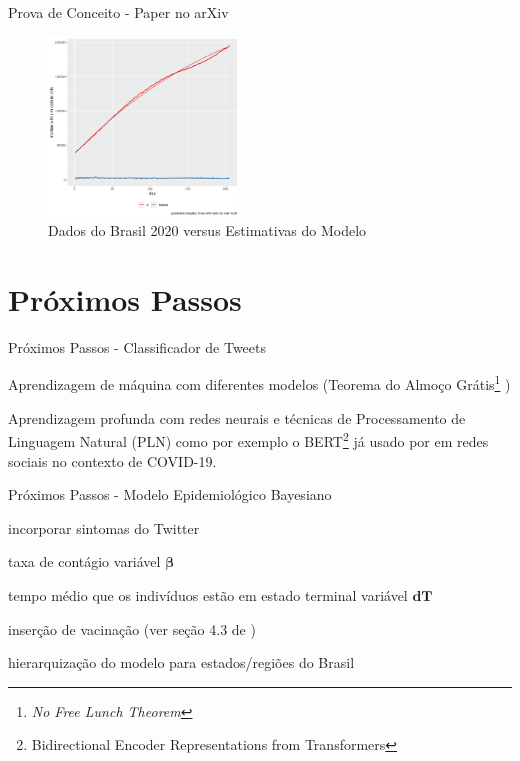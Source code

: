 \documentclass[aspectratio=169]{beamer}                    %
\begin{document}
\begin{frame}{Prova de Conceito - Paper no arXiv \parencite{storopoliSimulationDrivenCOVID19Epidemiological2021a}}
    \begin{figure}
        \centering
        \includegraphics[width=0.45\textwidth]{fit_brazil.png}
        \caption{Dados do Brasil 2020 versus Estimativas do Modelo}
        \label{fig:fit_brazil}
    \end{figure}
\end{frame}

\section{Próximos Passos}
\begin{frame}{Próximos Passos - Classificador de Tweets}
    \begin{vfilleditems}
        \item Aprendizagem de máquina com diferentes modelos (Teorema do Almoço Grátis\footnote{\textit{No Free Lunch Theorem}} \parencite{wolpertLackPrioriDistinctions1996})
        \item Aprendizagem profunda com redes neurais e técnicas de Processamento de Linguagem Natural (PLN)
        como por exemplo o BERT\footnote{Bidirectional Encoder Representations from Transformers} \parencite{devlinBERTPretrainingDeep2018}
        já usado por \textcite{Kaushal_2020,santosh2020detecting} em redes sociais no contexto de COVID-19.
    \end{vfilleditems}
\end{frame}

\begin{frame}{Próximos Passos - Modelo Epidemiológico Bayesiano}
    \begin{vfilleditems}
        \item incorporar sintomas do Twitter
        \item taxa de contágio variável $\boldsymbol{\beta}$
        \item tempo médio que os indivíduos estão em estado terminal variável $\boldsymbol{dT}$
        \item inserção de vacinação (ver seção 4.3 de \textcite{gleesonCalibratingCOVID19SEIR2021})
        \item hierarquização do modelo para estados/regiões do Brasil
    \end{vfilleditems}
\end{frame}
\end{document}
